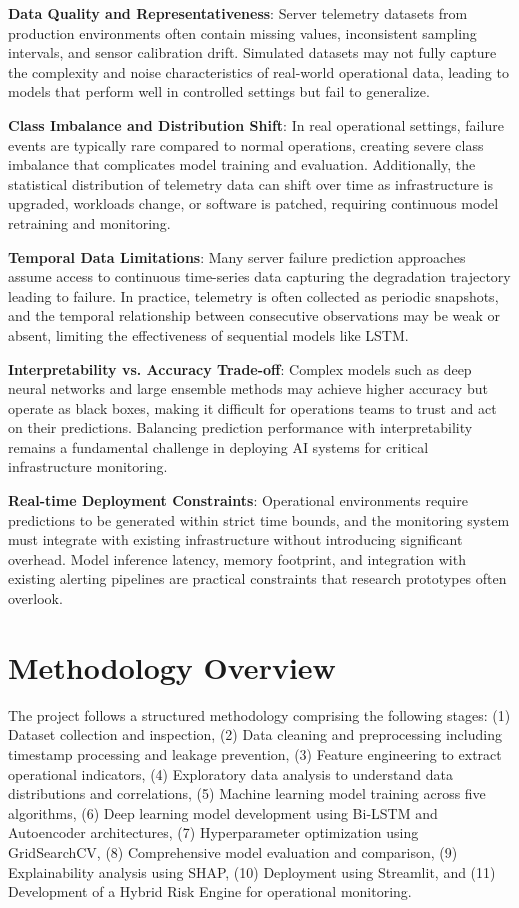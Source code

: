 \documentclass[12pt,letterpaper]{report}
\begin{document}
\textbf{Data Quality and Representativeness}: Server telemetry datasets from production environments often contain missing values, inconsistent sampling intervals, and sensor calibration drift. Simulated datasets may not fully capture the complexity and noise characteristics of real-world operational data, leading to models that perform well in controlled settings but fail to generalize.

\textbf{Class Imbalance and Distribution Shift}: In real operational settings, failure events are typically rare compared to normal operations, creating severe class imbalance that complicates model training and evaluation. Additionally, the statistical distribution of telemetry data can shift over time as infrastructure is upgraded, workloads change, or software is patched, requiring continuous model retraining and monitoring.

\textbf{Temporal Data Limitations}: Many server failure prediction approaches assume access to continuous time-series data capturing the degradation trajectory leading to failure. In practice, telemetry is often collected as periodic snapshots, and the temporal relationship between consecutive observations may be weak or absent, limiting the effectiveness of sequential models like LSTM.

\textbf{Interpretability vs. Accuracy Trade-off}: Complex models such as deep neural networks and large ensemble methods may achieve higher accuracy but operate as black boxes, making it difficult for operations teams to trust and act on their predictions. Balancing prediction performance with interpretability remains a fundamental challenge in deploying AI systems for critical infrastructure monitoring.

\textbf{Real-time Deployment Constraints}: Operational environments require predictions to be generated within strict time bounds, and the monitoring system must integrate with existing infrastructure without introducing significant overhead. Model inference latency, memory footprint, and integration with existing alerting pipelines are practical constraints that research prototypes often overlook.

\section{Methodology Overview}

The project follows a structured methodology comprising the following stages: (1) Dataset collection and inspection, (2) Data cleaning and preprocessing including timestamp processing and leakage prevention, (3) Feature engineering to extract operational indicators, (4) Exploratory data analysis to understand data distributions and correlations, (5) Machine learning model training across five algorithms, (6) Deep learning model development using Bi-LSTM and Autoencoder architectures, (7) Hyperparameter optimization using GridSearchCV, (8) Comprehensive model evaluation and comparison, (9) Explainability analysis using SHAP, (10) Deployment using Streamlit, and (11) Development of a Hybrid Risk Engine for operational monitoring.
\end{document}
